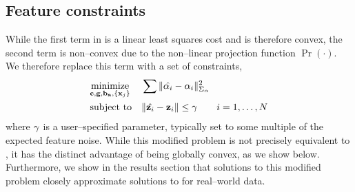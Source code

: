 \subsection{Feature constraints}

While the first term in  is a linear least
squares cost and is therefore convex, the second term is non--convex
due to the non--linear projection function $\Pr(\cdot)$.  We therefore
replace this term with a set of constraints,
\begin{equation}
  \begin{aligned}
    & \underset{\AllVars}{\text{minimize}}
    & & \sum \| \hat{\Accel_i} - \Accel_i \|_{\AccelCov}^2 \\
    & \text{subject to}
    & & \| \hat{\Feature_i} - \Feature_i \| \leq \Tol
    ~~~~~~
    i = 1,\ldots,N
  \end{aligned}
  \label{constrained-cost}
\end{equation}
where $\gamma$ is a user--specified parameter, typically set to some
multiple of the expected feature noise. While this modified problem is
not precisely equivalent to , it has the
distinct advantage of being globally convex, as we show
below. Furthermore, we show in the results section that solutions to
this modified problem closely approximate solutions to
 for real--world data.

